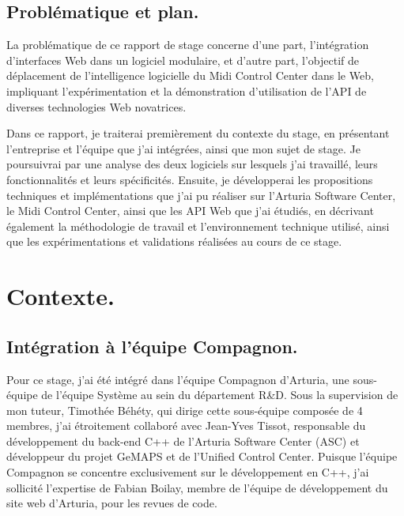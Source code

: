 \documentclass[francais]{rapportPFE}  %
\begin{document}
\subsection{Problématique et plan.}

La problématique de ce rapport de stage concerne d'une part, l'intégration d'interfaces Web dans un logiciel modulaire, et d'autre part, l'objectif de déplacement de l'intelligence logicielle du Midi Control Center dans le Web, impliquant l'expérimentation et la démonstration d'utilisation de l'API de diverses technologies Web novatrices.

Dans ce rapport, je traiterai premièrement du contexte du stage, en présentant l'entreprise et l'équipe que j'ai intégrées, ainsi que mon sujet de stage. Je poursuivrai par une analyse des deux logiciels sur lesquels j'ai travaillé, leurs fonctionnalités et leurs spécificités. Ensuite, je développerai les propositions techniques et implémentations que j'ai pu réaliser sur l'Arturia Software Center, le Midi Control Center, ainsi que les API Web que j'ai étudiés, en décrivant également la méthodologie de travail et l'environnement technique utilisé, ainsi que les expérimentations et validations réalisées au cours de ce stage.


\section{Contexte.}

\subsection{Intégration à l'équipe Compagnon.}
Pour ce stage, j'ai été intégré dans l'équipe Compagnon d'Arturia, une sous-équipe de l'équipe Système au sein du département R\&D. Sous la supervision de mon tuteur, Timothée Béhéty, qui dirige cette sous-équipe composée de 4 membres, j'ai étroitement collaboré avec Jean-Yves Tissot, responsable du développement du back-end C++ de l'Arturia Software Center (ASC) et développeur du projet GeMAPS et de l'Unified Control Center. Puisque l'équipe Compagnon se concentre exclusivement sur le développement en C++, j'ai sollicité l'expertise de Fabian Boilay, membre de l'équipe de développement du site web d'Arturia, pour les revues de code. 
\end{document}
